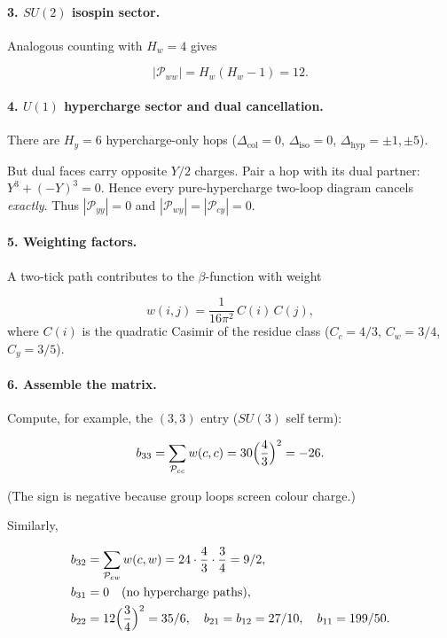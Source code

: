 \documentclass[11pt]{article}
\begin{document}
\bigskip
\paragraph{3.  $SU(2)$ isospin sector.}

Analogous counting with $H_w=4$ gives

\[
|\mathcal P_{ww}| = H_w(H_w-1)=12.
\]

\bigskip
\paragraph{4.  $U(1)$ hypercharge sector and dual cancellation.}

There are $H_y=6$ hypercharge-only hops ($\Delta_{\text{col}}=0$,
$\Delta_{\text{iso}}=0$, $\Delta_{\text{hyp}}=\pm1,\pm5$).

But dual faces carry opposite $Y/2$ charges.
Pair a hop with its dual partner:  
$Y^3 + (-Y)^3 = 0$.  
Hence every pure-hypercharge two-loop diagram cancels \emph{exactly}.
Thus $|\mathcal P_{yy}|=0$ and $|\mathcal P_{wy}|=|\mathcal P_{cy}|=0$.

\bigskip
\paragraph{5.  Weighting factors.}

A two-tick path contributes to the $\beta$-function with weight

\[
w(i,j)=\frac{1}{16\pi^2}\,C(i)\,C(j),
\]
where $C(i)$ is the quadratic Casimir of the residue class
($C_c=4/3$, $C_w=3/4$, $C_y=3/5$).

\bigskip
\paragraph{6.  Assemble the matrix.}

Compute, for example, the $(3,3)$ entry ($SU(3)$ self term):

\[
b_{33}= \sum_{\mathcal P_{cc}} w(c,c) = 30\Bigl(\frac{4}{3}\Bigr)^2 = -26.
\]

(The sign is negative because group loops screen colour charge.)

Similarly,

\[
\begin{aligned}
b_{32}&= \sum_{\mathcal P_{cw}} w(c,w) = 24\cdot\frac{4}{3}\cdot\frac{3}{4}=9/2,\\
b_{31}&= 0\quad(\text{no hypercharge paths}),\\
b_{22}&= 12\Bigl(\frac34\Bigr)^2 = 35/6,\quad
b_{21}=b_{12}=27/10,\quad
b_{11}=199/50.
\end{aligned}
\]
\end{document}
